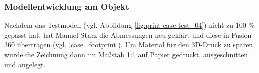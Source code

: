 \subsubsection{Modellentwicklung am Objekt}
Nachdem das Testmodell (vgl. Abbildung \ref{fig:print-case-test_04}) nicht zu 100	\% gepasst hat, hat Manuel Starz die Abmessungen neu geklärt und diese in Fusion 360 übertragen (vgl. \ref{case_footprint}). Um Material für den 3D-Druck zu sparen, wurde die Zeichnung dann im Maßstab 1:1 auf Papier gedruckt, ausgeschnitten und angelegt.